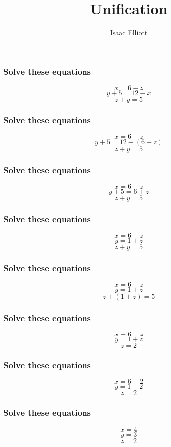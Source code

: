 \documentclass{beamer}
\title{Unification}
\author{Isaac Elliott}
\begin{document}
\frame{\titlepage}

\begin{frame}
  \frametitle{Solve these equations}

  $$ x = 6 - z $$
  $$ y + 5 = 12 - x $$
  $$ z + y = 5 $$

\end{frame}

\begin{frame}
  \frametitle{Solve these equations}

  $$ x = 6 - z $$
  $$ y + 5 = 12 - (6 - z) $$
  $$ z + y = 5 $$

\end{frame}

\begin{frame}
  \frametitle{Solve these equations}

  $$ x = 6 - z $$
  $$ y + 5 = 6 + z $$
  $$ z + y = 5 $$

\end{frame}

\begin{frame}
  \frametitle{Solve these equations}

  $$ x = 6 - z $$
  $$ y = 1 + z $$
  $$ z + y = 5 $$

\end{frame}

\begin{frame}
  \frametitle{Solve these equations}

  $$ x = 6 - z $$
  $$ y = 1 + z $$
  $$ z + (1 + z) = 5 $$

\end{frame}

\begin{frame}
  \frametitle{Solve these equations}

  $$ x = 6 - z $$
  $$ y = 1 + z $$
  $$ z = 2 $$

\end{frame}

\begin{frame}
  \frametitle{Solve these equations}

  $$ x = 6 - 2 $$
  $$ y = 1 + 2 $$
  $$ z = 2 $$

\end{frame}

\begin{frame}
  \frametitle{Solve these equations}

  $$ x = 4 $$
  $$ y = 3 $$
  $$ z = 2 $$

\end{frame}
\end{document}
